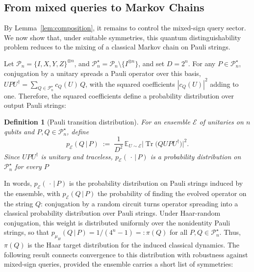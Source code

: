 \documentclass[
    aps,
    superscriptaddress,
    onecolumn,
    10pt,
    prx,
    nofootinbib
]{revtex4-2}
\newtheorem{definition}{Definition}
\newcommand{\E}{\mathbb E}
\theoremstyle{namedstatement}
\theoremstyle{plain}
\begin{document}
\subsection{From mixed queries to Markov Chains}
\label{sec:mixed-query-reduction}

By Lemma~\ref{lem:composition}, it remains to control the mixed-sign query sector. We now show that, under suitable symmetries, this quantum distinguishability problem reduces to the mixing of a classical Markov chain on Pauli strings.

Let $\mathcal{P}_{n}=\{I,X,Y,Z\}^{\otimes n}$, and
$\mathcal{P}_{n}^{\star}=\mathcal{P}_{n}\setminus\{I^{\otimes n}\}$, and set
$D=2^{n}$. For any $P\in\mathcal{P}_n^{\star}$, conjugation by a unitary spreads a Pauli operator over this basis,
$UPU^{\dagger}=\sum_{Q\in\mathcal{P}_{n}^{\star}}c_{Q}(U)\,Q$, with the squared
coefficients $|c_{Q}(U)|^{2}$ adding to one. Therefore, the squared coefficients define a
probability distribution over output Pauli strings:

\begin{definition}[Pauli transition distribution]
\label{def:pauli-dist}
For an ensemble $\mathcal{E}$ of unitaries on $n$ qubits and $P,Q\in\mathcal{P}_{n}^{\star}$, define
\begin{equation}
\label{eq:pauli-dist}
    p_{\mathcal{E}}(Q\,|\,P)
    \;:=\;\frac{1}{D^{2}}\,
    \E_{U\sim\mathcal{E}}
    \bigl|\operatorname{Tr}\bigl(QUPU^{\dagger}\bigr)\bigr|^{2}.
\end{equation}
Since $UPU^{\dagger}$ is unitary and traceless, $p_{\mathcal{E}}(\,\cdot\,|\,P)$
is a probability distribution on $\mathcal{P}_{n}^{\star}$ for every $P$
\end{definition}

In words, $p_{\mathcal{E}}(\,\cdot\,|\,P)$ is the probability distribution on
Pauli strings induced by the ensemble, with $p_{\mathcal{E}}(Q\,|\,P)$ the
probability of finding the evolved operator on the string $Q$: conjugation by a
random circuit turns operator spreading into a classical probability
distribution over Pauli strings. Under Haar-random conjugation, this weight is distributed uniformly over the nonidentity Pauli strings, so that $p_{\mu_{H}}(Q\,|\,P)=1/(4^{n}-1)=:\pi(Q)$ for all
$P,Q\in\mathcal{P}_{n}^{\star}$. Thus, $\pi(Q)$ is the Haar target distribution for the induced classical dynamics. The following result connects convergence to this distribution with robustness against mixed-sign queries, provided the ensemble carries a short list of symmetries:
\end{document}
